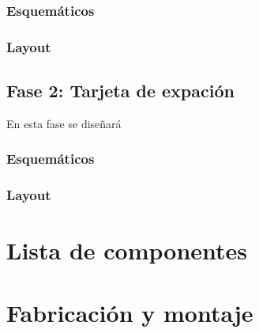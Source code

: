 		\subsubsection{Esquemáticos}
		
		\subsubsection{Layout}
		
	\subsection{Fase 2: Tarjeta de expación}
	
	En esta fase se diseñará 
		\subsubsection{Esquemáticos}
		
		\subsubsection{Layout}
		
\section{Lista de componentes}
	
\section{Fabricación y montaje}



